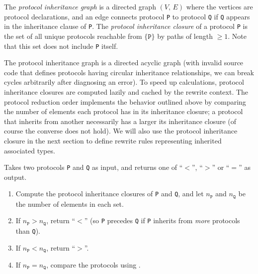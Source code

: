 \documentclass[../generics]{subfiles}
\begin{document}
\begin{definition}
%
%
%
%
%
%
%
The \emph{protocol inheritance graph} is a directed graph $(V,\,E)$ where the vertices are protocol declarations, and an edge connects protocol \texttt{P} to protocol \texttt{Q} if \texttt{Q} appears in the inheritance clause of \texttt{P}. The \emph{protocol inheritance closure} of a protocol \texttt{P} is the set of all unique protocols reachable from $\{\texttt{P}\}$ by paths of length $\ge 1$. Note that this set does not include \texttt{P} itself.
\end{definition}
%
The protocol inheritance graph is a directed acyclic graph (with invalid source code that defines protocols having circular inheritance relationships, we can break cycles arbitrarily after diagnosing an error). To speed up calculations, protocol inheritance closures are computed lazily and cached by the rewrite context. The protocol reduction order implements the behavior outlined above by comparing the number of elements each protocol has in its inheritance closure; a protocol that inherits from another necessarily has a larger its inheritance closure (of course the converse does not hold). We will also use the protocol inheritance closure in the next section to define rewrite rules representing inherited associated types.
%
\begin{algorithm}\label{protocol reduction order} Takes two protocols \texttt{P} and \texttt{Q} as input, and returns one of ``$<$'', ``$>$'' or ``$=$'' as output.
\begin{enumerate}
\item Compute the protocol inheritance closures of \texttt{P} and \texttt{Q}, and let $n_\texttt{P}$ and $n_\texttt{Q}$ be the number of elements in each set.
\item If $n_\texttt{P}>n_\texttt{Q}$, return ``$<$'' (so \texttt{P} precedes \texttt{Q} if \texttt{P} inherits from \emph{more} protocols than \texttt{Q}).
\item If $n_\texttt{P}<n_\texttt{Q}$, return ``$>$''.
\item If $n_\texttt{P}=n_\texttt{Q}$, compare the protocols using .
\end{enumerate}
\end{algorithm}
\end{document}
